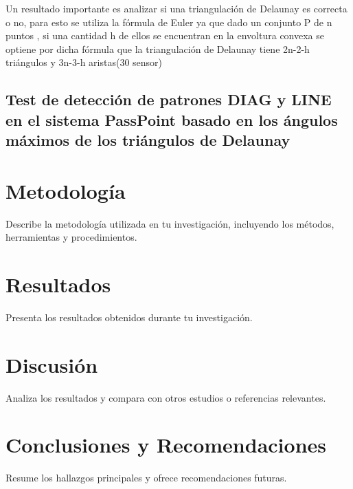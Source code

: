 \documentclass[12pt]{report}
\begin{document}
	
	Un resultado importante es analizar si una triangulación de Delaunay es correcta o no, para esto se utiliza la fórmula de Euler ya que dado un conjunto P de n puntos , si una cantidad h de ellos se encuentran en la envoltura convexa se optiene por dicha fórmula que  la triangulación de Delaunay tiene 2n-2-h triángulos y 3n-3-h aristas(30 sensor)
	
\section{Test de detección de patrones DIAG y LINE en el sistema PassPoint basado en los ángulos máximos de los triángulos de Delaunay  }
	
\chapter{Metodología}
Describe la metodología utilizada en tu investigación, incluyendo los métodos, herramientas y procedimientos.

\chapter{Resultados}
Presenta los resultados obtenidos durante tu investigación.

\chapter{Discusión}
Analiza los resultados y compara con otros estudios o referencias relevantes.

\chapter{Conclusiones y Recomendaciones}
Resume los hallazgos principales y ofrece recomendaciones futuras.
\end{document}

